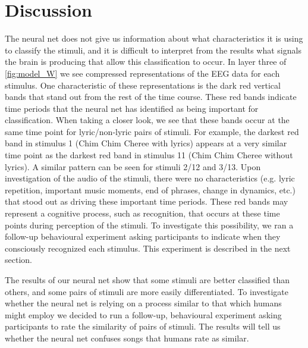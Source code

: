 \section{Discussion}
The neural net does not give us information about what characteristics it is using to classify the stimuli, and it is difficult to interpret from the results what signals the brain is producing that allow this classification to occur. 
In layer three of \autoref{fig:model_W} we see compressed representations of the EEG data for each stimulus. 
One characteristic of these representations is the dark red vertical bands that stand out from the rest of the time course. 
These red bands indicate time periods that the neural net has identified as being important for classification. 
When taking a closer look, we see that these bands occur at the same time point for lyric/non-lyric pairs of stimuli. 
For example, the darkest red band in stimulus 1 (Chim Chim Cheree with lyrics) appears at a very similar time point as the darkest red band in stimulus 11 (Chim Chim Cheree without lyrics).
A similar pattern can be seen for stimuli 2/12 and 3/13.
Upon investigation of the audio of the stimuli, there were no characteristics (e.g. lyric repetition, important music moments, end of phrases, change in dynamics, etc.) that stood out as driving these important time periods.
These red bands may represent a cognitive process, such as recognition, that occurs at these time points during perception of the stimuli. 
To investigate this possibility, we ran a follow-up behavioural experiment asking participants to indicate when they consciously recognized each stimulus. 
This experiment is described in the next section.

The results of our neural net show that some stimuli are better classified than others, and some pairs of stimuli are more easily differentiated. 
To investigate whether the neural net is relying on a process similar to that which humans might employ we decided to run a follow-up, behavioural experiment asking participants to rate the similarity of pairs of stimuli. 
The results will tell us whether the neural net confuses songs that humans rate as similar. 